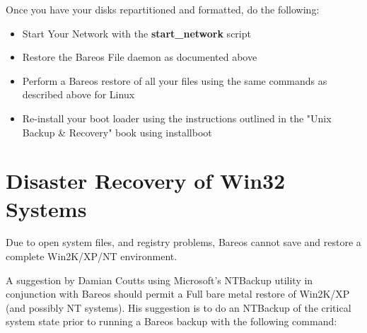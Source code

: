 Once you have your disks repartitioned and formatted, do the following:

\begin{itemize}
\item Start Your Network with the {\bf start\_network} script
\item Restore the Bareos File daemon as documented above
\item Perform a Bareos restore of all your files using the same  commands as
   described above for Linux
\item Re-install your boot loader using the instructions outlined  in the
   "Unix Backup \& Recovery" book  using installboot
\end{itemize}



\label{Win3233}
\section{Disaster Recovery of Win32 Systems}

Due to open system files, and registry problems, Bareos cannot save and
restore a complete Win2K/XP/NT environment.

A suggestion by Damian Coutts using Microsoft's NTBackup utility in
conjunction with Bareos should permit a Full bare metal restore of Win2K/XP
(and possibly NT systems). His suggestion is to do an NTBackup of the critical
system state prior to running a Bareos backup with the following command:

